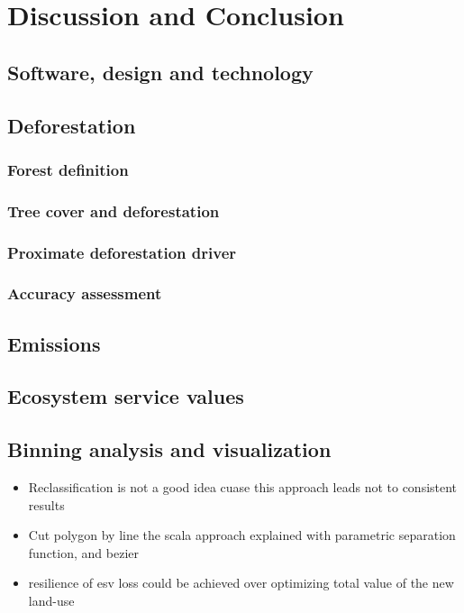 \chapter{Discussion and Conclusion}
\label{ch:discussion}

	\section{Software, design and technology}

	\section{Deforestation}
	\label{sec:deforestation}

		\subsection{Forest definition}
		\label{subsec:forest_definition}

		\subsection{Tree cover and deforestation}
		\label{subsec:tree_cover_and_deforestation}

		\subsection{Proximate deforestation driver}
		\label{subsec:proxy_deforestation_driver}

		\subsection{Accuracy assessment}
		\label{subsec:accuracy_assessment}

	\section{Emissions}

	\section{Ecosystem service values}

	\section{Binning analysis and visualization}


\begin{itemize}
	\item Reclassification is not a good idea cuase this approach leads not to consistent results
	\item Cut polygon by line the scala approach explained with parametric separation function, and bezier 
	\item resilience of esv loss could be achieved over optimizing total value of the new land-use  
\end{itemize}